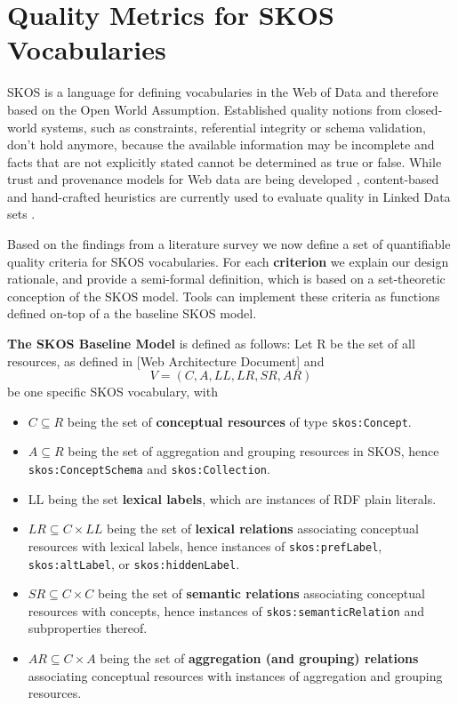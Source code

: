 \section{Quality Metrics for SKOS Vocabularies}\label{sec:metrics}

SKOS is a language for defining vocabularies in the Web of Data and therefore based on the Open World Assumption. Established quality notions from closed-world systems, such as constraints, referential integrity or schema validation, don’t hold anymore, because the available information may be incomplete and facts that are not explicitly stated cannot be determined as true or false. While trust and provenance models for Web data are being developed \cite{Omitola2011,Hartig2009}, content-based and hand-crafted heuristics are currently used to evaluate quality in Linked Data sets \cite{Heath2011}.

Based on the findings from a literature survey we now define a set of quantifiable quality criteria for SKOS vocabularies. For each \textbf{criterion} we explain our design rationale, and provide a semi-formal definition, which is based on a set-theoretic conception of the SKOS model. Tools can implement these criteria as functions defined on-top of a the baseline SKOS model.

\begin{definition} \textbf{The SKOS Baseline Model} is defined as follows:
Let R be the set of all resources, as defined in [Web Architecture Document] and \[V = (C, A, LL, LR, SR, AR)\] be one specific SKOS vocabulary, with

\begin{itemize}
	\item \(C \subseteq R\) being the set of \textbf{conceptual resources} of type \texttt{skos:Concept}.
	\item \(A \subseteq R\) being the set of aggregation and grouping resources in SKOS, hence \texttt{skos:ConceptSchema} and \texttt{skos:Collection}.
	\item LL being the set \textbf{lexical labels}, which are instances of RDF plain literals.
	\item \(LR \subseteq C \times LL\) being the set of \textbf{lexical relations} associating conceptual resources with lexical labels, hence instances of \texttt{skos:prefLabel}, \texttt{skos:altLabel}, or \texttt{skos:hiddenLabel}.
\item \(SR \subseteq C \times C\) being the set of \textbf{semantic relations} associating conceptual resources with concepts, hence instances of \texttt{skos:semanticRelation} and subproperties thereof.
\item \(AR \subseteq C \times A\) being the set of \textbf{aggregation (and grouping) relations} associating conceptual resources with instances of aggregation and grouping resources.
\end{itemize}
\end{definition}

